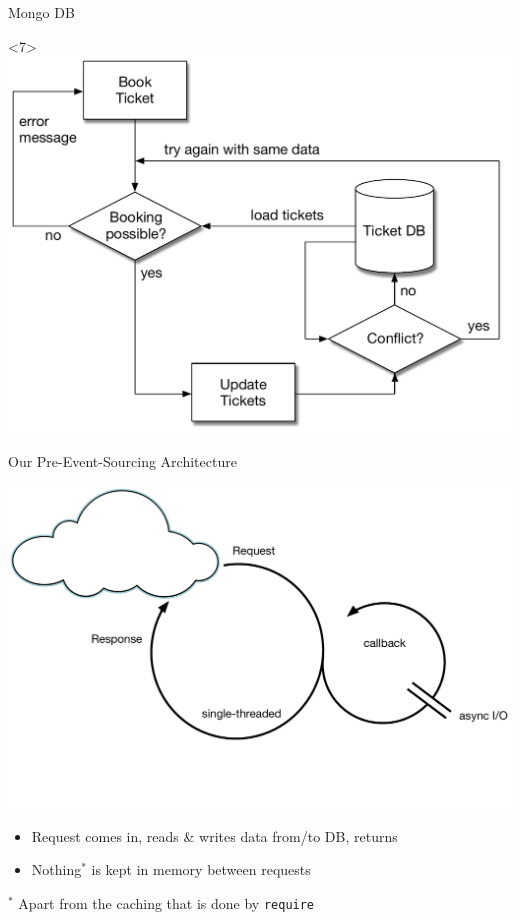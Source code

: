 \begin{frame}[fragile]{Mongo DB}
\begin{center}
\begin{onlyenv}<7>
\includegraphics[width=.85\textwidth]{../OptimisticLocking6.pdf}
\end{onlyenv}

\end{center}

\end{frame}

\begin{frame}[fragile]{Our Pre-Event-Sourcing Architecture}

\includegraphics[width=.7\textwidth]{../Nodejs3.pdf}

\begin{itemize}
\item Request comes in, reads \& writes data from/to DB, returns
\item Nothing$^*$ is kept in memory between requests
\end{itemize}

{ \tiny $^*$ Apart from the caching that is done by \texttt{require} }
\end{frame}


